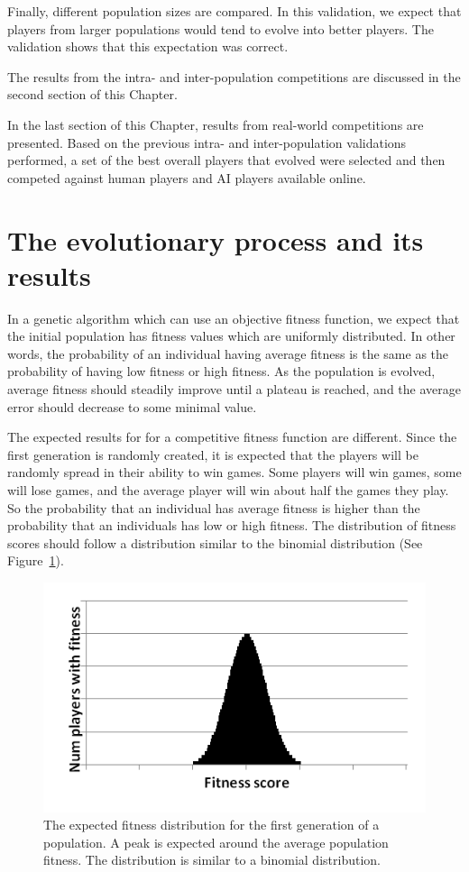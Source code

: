 Finally, different population sizes are compared. In this validation, we expect
that players from larger populations would tend to evolve into better players.
The validation shows that this expectation was correct.

The results from the intra- and inter-population competitions are discussed in
the second section of this Chapter.

In the last section of this Chapter, results from real-world competitions are
presented. Based on the previous intra- and inter-population validations
performed, a set of the best overall players that evolved were selected and then
competed against human players and AI players available online.

\section{The evolutionary process and its results}

In a genetic algorithm which can use an objective fitness function, we expect
that the initial population has fitness values which are uniformly distributed.
In other words, the probability of an individual having average fitness is the
same as the probability of having low fitness or high fitness. As the population
is evolved, average fitness should steadily improve until a plateau is reached,
and the average error should decrease to some minimal value.

The expected results for for a competitive fitness function are different. Since
the first generation is randomly created, it is expected that the players will
be randomly spread in their ability to win games. Some players will win games,
some will lose games, and the average player will win about half the games they
play. So the probability that an individual has average fitness is higher than
the probability that an individuals has low or high fitness. The distribution of
fitness scores should follow a distribution similar to the binomial distribution
(See Figure~\ref{figure-binomial}).

\begin{figure}[htbp]
\centerline{\includegraphics[width=0.75\columnwidth]{Figures/binomial.png}}
\caption[Binomial Distribution]{The expected fitness distribution for the first
generation of a population. A peak is expected around the average population
fitness. The distribution is similar to a binomial distribution.}
\label{figure-binomial}
\end{figure}

